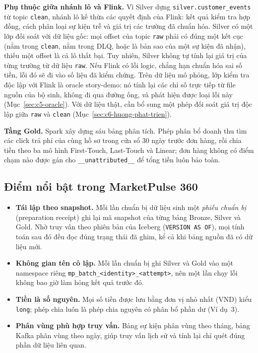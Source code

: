 \textbf{Phụ thuộc giữa nhánh lô và Flink.} Vì Silver dựng \texttt{silver.customer\_events} từ topic \texttt{clean}, nhánh lô kế thừa các quyết định của Flink: kết quả kiểm tra hợp đồng, cách phân loại sự kiện trễ và giá trị các trường đã chuẩn hóa. Silver có một lớp đối soát với dữ liệu gốc: mọi offset của topic \texttt{raw} phải có đúng một kết cục (nằm trong \texttt{clean}, nằm trong DLQ, hoặc là bản sao của một sự kiện đã nhận), thiếu một offset là cả lô thất bại. Tuy nhiên, Silver không tự tính lại giá trị của từng trường từ dữ liệu \texttt{raw}. Nếu Flink có lỗi logic, chẳng hạn chuẩn hóa sai số tiền, lỗi đó sẽ đi vào số liệu đã kiểm chứng. Trên dữ liệu mô phỏng, lớp kiểm tra độc lập với Flink là oracle story-demo: nó tính lại các chỉ số trực tiếp từ file nguồn của bộ sinh, không đi qua đường ống, và phát hiện được loại lỗi này (Mục~\ref{sec:c5-oracle}). Với dữ liệu thật, cần bổ sung một phép đối soát giá trị độc lập giữa \texttt{raw} và \texttt{clean} (Mục~\ref{sec:c6-huong-phat-trien}).

\textbf{Tầng Gold.} Spark xây dựng sáu bảng phân tích. Phép phân bổ doanh thu tìm các click trả phí của cùng hồ sơ trong cửa sổ 30 ngày trước đơn hàng, rồi chia tiền theo ba mô hình First-Touch, Last-Touch và Linear; đơn hàng không có điểm chạm nào được gán cho \texttt{\_\_unattributed\_\_} để tổng tiền luôn bảo toàn.

\subsection{Điểm nổi bật trong MarketPulse 360}
\label{sec:c3-lakehouse-hien-thuc}
\begin{itemize}
    \item \textbf{Tái lập theo snapshot.} Mỗi lần chuẩn bị dữ liệu sinh một \emph{phiếu chuẩn bị} (preparation receipt) ghi lại mã snapshot của từng bảng Bronze, Silver và Gold. Nhờ truy vấn theo phiên bản của Iceberg (\texttt{VERSION AS OF}), mọi tính toán sau đó đều đọc đúng trạng thái đã ghim, kể cả khi bảng nguồn đã có dữ liệu mới.
    \item \textbf{Không gian tên cô lập.} Mỗi lần chuẩn bị ghi Silver và Gold vào một namespace riêng \texttt{mp\_batch\_<identity>\_<attempt>}, nên một lần chạy lỗi không bao giờ làm hỏng kết quả trước đó.
    \item \textbf{Tiền là số nguyên.} Mọi số tiền được lưu bằng đơn vị nhỏ nhất (VND) kiểu \texttt{long}; phép chia luôn là phép chia nguyên có phân bổ phần dư (Ví dụ~3).
    \item \textbf{Phân vùng phù hợp truy vấn.} Bảng sự kiện phân vùng theo tháng, bảng Kafka phân vùng theo ngày, giúp truy vấn lịch sử và tính lại chỉ quét đúng phần dữ liệu liên quan.
\end{itemize}

